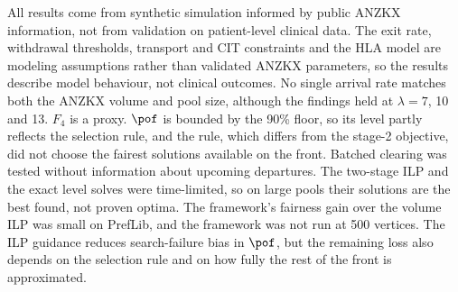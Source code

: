 All results come from synthetic simulation informed by public ANZKX
information, not from validation on patient-level clinical data. The
exit rate, withdrawal thresholds, transport and CIT constraints and
the HLA model are modeling assumptions rather than validated ANZKX
parameters, so the results describe model behaviour, not clinical
outcomes. No single arrival rate matches both the ANZKX volume and
pool size, although the findings held at $\lambda = 7$, 10 and 13.
$F_4$ is a proxy. $\pof$ is bounded by the 90\% floor, so its level
partly reflects the selection rule, and the rule, which differs from
the stage-2 objective, did not choose the fairest solutions available
on the front. Batched clearing was tested without information about
upcoming departures. The two-stage ILP and the exact level solves were
time-limited, so on large pools their solutions are the best found,
not proven optima. The framework's fairness gain over the volume ILP
was small on PrefLib, and the framework was not run at 500 vertices.
The ILP guidance reduces search-failure bias in $\pof$, but the
remaining loss also depends on the selection rule and on how fully the
rest of the front is approximated.
